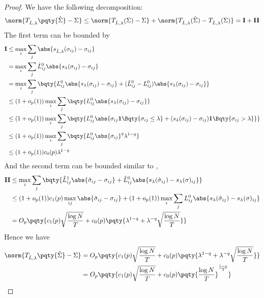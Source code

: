 \begin{proof}
    We have the following decomposition:
    \begin{equation*}
        \norm{T_{\hat{L},\lambda}\pqty{\hat{\Sigma}} - \Sigma } \leq \norm{T_{\hat{L} ,\lambda}(\Sigma) - \Sigma} +\norm{T_{\hat{L}, \lambda}(\hat{\Sigma}) - T_{\hat{L},\lambda}(\Sigma)} = \mathbf{I} + \mathbf{II}
    \end{equation*}
    The first term can be bounded by 
    \begin{align*}
        \mathbf{I} &\leq \max_{i} \sum_{j} \abs{s_{\hat{L}, \lambda}(\sigma_{ij}) - \sigma_{ij}} \\
        &= \max_{i} \sum_{j} \hat{L}_{ij}^{0} \abs{s_{\lambda}(\sigma_{ij}) - \sigma_{ij}}\\
        &= \max_{i} \sum_{j} \bqty{L_{ij}^{0} \abs{s_{\lambda}(\sigma_{ij}) - \sigma_{ij}} + (\hat{L}_{ij}^{0} - L_{ij}^{0})\abs{s_{\lambda}(\sigma_{ij}) - \sigma_{ij}}} \\
        &\leq (1 + o_{p}(1))\max_{i} \sum_{j} \bqty{L_{ij}^{0} \abs{s_{\lambda}(\sigma_{ij}) - \sigma_{ij}}}\\
        &\leq (1 + o_{p}(1))\max_{i} \sum_{j} \bqty{L_{ij}^{0} \abs{\sigma_{ij} \mathbf{1}\Bqty{\sigma_{ij}\leq \lambda} + (s_{\lambda}(\sigma_{ij}) - \sigma_{ij}) \mathbf{1}\Bqty{\sigma_{ij} > \lambda}}}\\
        &\leq (1 + o_{p}(1)) \max_{i} \sum_{j} \bqty{L_{ij}^{0}\abs{\sigma_{ij}}^{q} \lambda^{1 -q}}\\
        &\leq (1 + o_{p}(1)) c_{0}(p) \lambda^{1-q}
    \end{align*}
    And the second term can be bounded similar to \cite{rothman2009GeneralizedThresholding}, 
    \begin{align*}
        \mathbf{II} &\leq  \max_{i} \sum_{j} \bqty{\hat{L}_{ij}^{1} \abs{\hat{\sigma}_{ij} - \sigma_{ij}} + \hat{L}_{ij}^{0} \abs{s_{\lambda}(\hat{\sigma}_{ij}) - s_{\lambda} (\sigma)_{ij}}}\\
        &\leq (1 + o_{p}(1))c_{1}(p)\max_{ij} \abs{\hat{\sigma}_{ij} - \sigma_{ij}} + (1 + o_{p}(1)) \max_{i} \sum_{j} L_{ij}^{0} \abs{s_{\lambda}(\hat{\sigma}_{ij}) - s_{\lambda} (\sigma)_{ij}} \\
        &= O_{p}\pqty{c_{1}(p) \sqrt{\frac{\log N}{T}} + c_{0}(p) \pqty{\lambda^{1-q} + \lambda^{-q} \sqrt{\frac{\log N}{T}}}} \\
    \end{align*}
    Hence we have 
    \begin{align*}
        \norm{T_{\hat{L},\lambda}\pqty{\hat{\Sigma}} - \Sigma } &= O_{p}\pqty{c_{1}(p) \sqrt{\frac{\log N}{T}} + c_{0}(p) \pqty{\lambda^{1-q} + \lambda^{-q} \sqrt{\frac{\log N}{T}}}} \\
        &= O_{p}\pqty{c_{1}(p) \sqrt{\frac{\log N}{T}} + c_{0}(p)\pqty{\frac{\log N}{T}}^{\frac{1-q}{2}}}
    \end{align*}
\end{proof}

